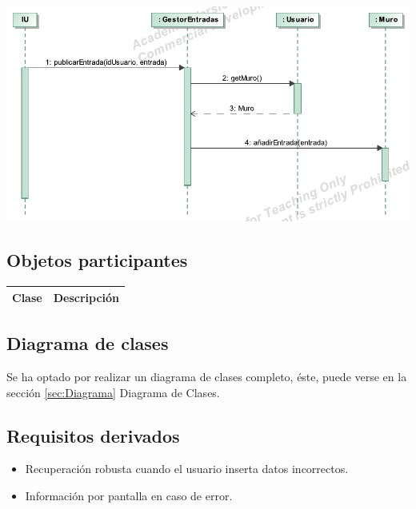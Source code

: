 \documentclass[12pt, a4paper, titlepage]{article}
\begin{document}
\begin{center}
	\includegraphics{Imagenes/OperacionPublicarEntrada.pdf}
\end{center}
\subsection{Objetos participantes}

\begin{center}

\begin{tabular}{|c|p{14cm}|}
	\hline
	\textbf{Clase} & \textbf{Descripción}\\ \hline
\end{tabular}

\end{center}

\subsection{Diagrama de clases}
Se ha optado por realizar un diagrama de clases completo, éste, puede verse en la sección \ref{sec:Diagrama} Diagrama de Clases.
\subsection{Requisitos derivados}

\begin{itemize}
	\item Recuperación robusta cuando el usuario inserta datos incorrectos.
	\item Información por pantalla en caso de error.
\end{itemize}
\end{document}
